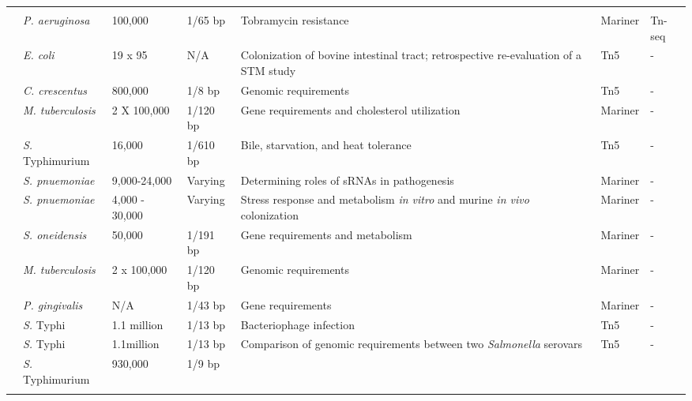\begin{landscape}
\begin{longtable}{ l
    				l
				l
				l
				p{2in}
				l
				l}
          &       &       &  &       &       &  \\
    \multirow{2}[0]{*}{\textcite{Gallagher2011}}  & \multirow{2}[0]{*}{\textit{P. aeruginosa}} & \multirow{2}[0]{*}{100,000} & \multirow{2}[0]{*}{1/65 bp} & \multirow{2}[0]{2in}{Tobramycin resistance} & \multirow{2}[0]{*}{Mariner} & \multirow{2}[0]{*}{Tn-seq} \\
          &       &       &       &       &       & (circle method)  \\
    \textcite{Eckert2011}  & \textit{E. coli} & 19 x 95 & N/A & Colonization of bovine intestinal tract; retrospective re-evaluation of a STM study & Tn5   & - \\
    \textcite{Christen2011}  & \textit{C. crescentus} & 800,000 & 1/8 bp & Genomic requirements & Tn5   & - \\
    \textcite{Griffin2011}  & \textit{M. tuberculosis} & 2 X 100,000 & 1/120 bp & Gene requirements and cholesterol utilization & Mariner & - \\
    \textcite{Khatiwara2012}  & {\it S.} Typhimurium & 16,000 & 1/610 bp & Bile, starvation, and heat tolerance & Tn5   & - \\
    \textcite{Mann2012}  & \textit{S. pnuemoniae} & 9,000-24,000 & Varying & Determining roles of sRNAs in pathogenesis & Mariner & - \\
    \textcite{Opijnen2012}  & \textit{S. pnuemoniae} & 4,000 - 30,000 & Varying & Stress response and metabolism {\it in vitro} and murine {\it in vivo} colonization & Mariner & - \\
    \textcite{Brutinel2012} & \textit{S. oneidensis} & 50,000 &  1/191 bp & Gene requirements and metabolism & Mariner & - \\
    \textcite{Zhang2012} & \textit{M. tuberculosis} & 2 x 100,000 &  1/120 bp & Genomic requirements & Mariner & - \\
    \textcite{Klein2012}  & \textit{P. gingivalis} & N/A   & 1/43 bp & Gene requirements & Mariner & - \\
    \textcite{Pickard2013}  & {\it S.} Typhi & 1.1 million & 1/13 bp & Bacteriophage infection & Tn5   & - \\
    \multirow{2}[1]{*}{\textcite{Barquist2013a}}  & {\it S.} Typhi & 1.1million & 1/13 bp & \multirow{2}[1]{2in}{Comparison of genomic requirements between two {\it Salmonella} serovars} & \multirow{2}[1]{*}{Tn5} & \multirow{2}[1]{*}{-} \\
          & {\it S.} Typhimurium & 930,000 & 1/9 bp &       &       &  \\
    \bottomrule
    \label{tab:studies}%
    \end{longtable}%
\end{landscape}%
\endgroup

